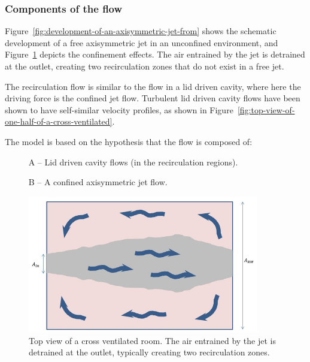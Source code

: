 \subsubsection{Components of the flow}\label{components-of-the-flow}

Figure~\ref{fig:development-of-an-axisymmetric-jet-from} shows the schematic development of a free axisymmetric jet in an unconfined environment, and Figure~\ref{fig:top-view-of-a-cross-ventilated-room.-the-air} depicts the confinement effects. The air entrained by the jet is detrained at the outlet, creating two recirculation zones that do not exist in a free jet.

The recirculation flow is similar to the flow in a lid driven cavity, where here the driving force is the confined jet flow. Turbulent lid driven cavity flows have been shown to have self-similar velocity profiles, as shown in Figure~\ref{fig:top-view-of-one-half-of-a-cross-ventilated}.

The model is based on the hypothesis that the flow is composed of:

~~~~~ A -- Lid driven cavity flows (in the recirculation regions).

~~~~~ B -- A confined axisymmetric jet flow.

\begin{figure}[hbtp] %
\centering
\includegraphics[width=0.9\textwidth, height=0.9\textheight, keepaspectratio=true]{media/image2623.png}
\caption{Top view of a cross ventilated room. The air entrained by the jet is detrained at the outlet, typically creating two recirculation zones. \protect \label{fig:top-view-of-a-cross-ventilated-room.-the-air}}
\end{figure}

